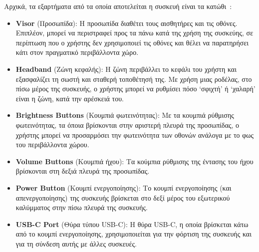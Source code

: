 Αρχικά, τα εξαρτήματα από τα οποία αποτελείται η συσκευή είναι τα κατώθι~\cite{scooley_2023_hololens}\cite{microsoft_hololens}:
\begin{itemize}
    \item \textbf{Visor} (Προσωπίδα): Η προσωπίδα διαθέτει τους αισθητήρες και τις οθόνες. Επιπλέον, μπορεί να περιστραφεί προς τα πάνω κατά της χρήση της συσκεύης, σε περίπτωση που ο χρήστης δεν χρησιμοποιεί τις οθόνες και θέλει να παρατηρήσει κάτι στον πραγματικό περιβάλλοντα χώρο.
    \item \textbf{Headband} (Ζώνη κεφαλής): Η ζώνη περιβάλλει το κεφάλι του χρήστη και εξασφαλίζει τη σωστή και σταθερή τοποθέτησή της. Με χρήση μιας ροδέλας, στο πίσω μέρος της συσκευής, ο χρήστης μπορεί να ρυθμίσει πόσο `σφιχτή' ή `χαλαρή' είναι η ζώνη, κατά την αρέσκειά του.
    \item \textbf{Brightness Buttons} (Κουμπιά φωτεινότητας): Με τα κουμπιά ρύθμισης φωτεινότητας, τα όποια βρίσκονται στην αριστερή πλευρά της προσωπίδας, ο χρήστης μπορεί να προσαρμόσει την φωτεινότητα των οθονών ανάλογα με το φως του περιβάλλοντα χώρου.
    \item \textbf{Volume Buttons} (Κουμπιά ήχου): Τα κούμπια ρύθμισης της έντασης του ήχου βρίσκονται στη δεξιά πλευρά της προσωπίδας.
    \item \textbf{Power Button} (Κουμπί ενεργοποίησης): Το κουμπί ενεργοποίησης (και απενεργοποίησης) της συσκευής βρίσκεται στο δεξί μέρος του εξωτερικού καλύμματος στην πίσω πλευρά της συσκευής.
    \item \textbf{USB-C Port} (Θύρα τύπου USB-C): Η θύρα USB-C, η οποία βρίσκεται κάτω από το κουμπί ενεργοποίησης, χρησιμοποιείται για την φόρτιση της συσκευής και για τη σύνδεση αυτής με άλλες συσκευές.
\end{itemize}

